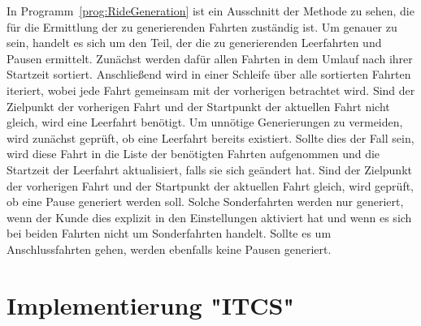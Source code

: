     In Programm~\ref{prog:RideGeneration} ist ein Ausschnitt der Methode zu sehen, die für die Ermittlung der zu generierenden Fahrten zuständig ist. Um genauer zu sein,
    handelt es sich um den Teil, der die zu generierenden Leerfahrten und Pausen ermittelt. Zunächst werden dafür allen Fahrten in dem Umlauf nach ihrer Startzeit sortiert.
    Anschließend wird in einer Schleife über alle sortierten Fahrten iteriert, wobei jede Fahrt gemeinsam mit der vorherigen betrachtet wird. Sind der Zielpunkt der vorherigen Fahrt
    und der Startpunkt der aktuellen Fahrt nicht gleich, wird eine Leerfahrt benötigt. Um unnötige Generierungen zu vermeiden, wird zunächst geprüft, ob eine Leerfahrt bereits existiert.
    Sollte dies der Fall sein, wird diese Fahrt in die Liste der benötigten Fahrten aufgenommen und die Startzeit der Leerfahrt aktualisiert, falls sie sich geändert hat.
    Sind der Zielpunkt der vorherigen Fahrt und der Startpunkt der aktuellen Fahrt gleich, wird geprüft, ob eine Pause generiert werden soll. Solche Sonderfahrten werden nur generiert, wenn
    der Kunde dies explizit in den Einstellungen aktiviert hat und wenn es sich bei beiden Fahrten nicht um Sonderfahrten handelt. Sollte es um Anschlussfahrten gehen,
    werden ebenfalls keine Pausen generiert.

\section{Implementierung "ITCS"}\label{sec:ImplementierungITCS}
    
